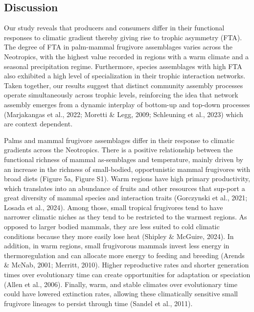 \documentclass[
]{agujournal2019}
\begin{document}
\subsection{Discussion}\label{discussion}

Our study reveals that producers and consumers differ in their
functional responses to climatic gradient thereby giving rise to trophic
asymmetry (FTA). The degree of FTA in palm-mammal frugivore assemblages
varies across the Neotropics, with the highest value recorded in regions
with a warm climate and a seasonal precipitation regime. Furthermore,
species assemblages with high FTA also exhibited a high level of
specialization in their trophic interaction networks. Taken together,
our results suggest that distinct community assembly processes operate
simultaneously across trophic levels, reinforcing the idea that network
assembly emerges from a dynamic interplay of bottom-up and top-down
processes (Marjakangas et al., 2022; Moretti \& Legg, 2009; Schleuning
et al., 2023) which are context dependent.

Palms and mammal frugivore assemblages differ in their response to
climatic gradients across the Neotropics. There is a positive
relationship between the functional richness of mammal as-semblages and
temperature, mainly driven by an increase in the richness of
small-bodied, opportunistic mammal frugivores with broad diets (Figure
5a, Figure S1). Warm regions have high primary productivity, which
translates into an abundance of fruits and other resources that sup-port
a great diversity of mammal species and interaction traits (Gorczynski
et al., 2021; Losada et al., 2024). Among those, small tropical
frugivores tend to have narrower climatic niches as they tend to be
restricted to the warmest regions. As opposed to larger bodied mammals,
they are less suited to cold climatic conditions because they more
easily lose heat (Shipley \& McGuire, 2024). In addition, in warm
regions, small frugivorous mammals invest less energy in
thermoregulation and can allocate more energy to feeding and breeding
(Arends \& McNab, 2001; Merritt, 2010). Higher reproductive rates and
shorter generation times over evolutionary time can create opportunities
for adaptation or speciation (Allen et al., 2006). Finally, warm, and
stable climates over evolutionary time could have lowered extinction
rates, allowing these climatically sensitive small frugivore lineages to
persist through time (Sandel et al., 2011).
\end{document}
